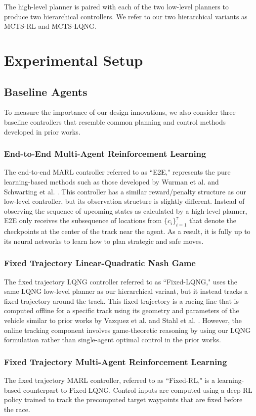 The high-level planner is paired with each of the two low-level planners to produce two hierarchical controllers. We refer to our two hierarchical variants as MCTS-RL and MCTS-LQNG.

\section{Experimental Setup}
\subsection{Baseline Agents}
To measure the importance of our design innovations, we also consider three baseline controllers that resemble common planning and control methods developed in prior works.  
\subsubsection{End-to-End Multi-Agent Reinforcement Learning}
The end-to-end MARL controller referred to as ``E2E," represents the pure learning-based methods such as those developed by Wurman et al. and Schwarting et al. \cite{sonyai, Schwarting2021}. This controller has a similar reward/penalty structure as our low-level controller, but its observation structure is slightly different. Instead of observing the sequence of upcoming states as calculated by a high-level planner, E2E only receives the subsequence of locations from $\{c_i\}_{i=1}^{\tau}$ that denote the checkpoints at the center of the track near the agent. As a result, it is fully up to its neural networks to learn how to plan strategic and safe moves. 

\subsubsection{Fixed Trajectory Linear-Quadratic Nash Game}
The fixed trajectory LQNG controller referred to as ``Fixed-LQNG," uses the same LQNG low-level planner as our hierarchical variant, but it instead tracks a fixed trajectory around the track. This fixed trajectory is a racing line that is computed offline for a specific track using its geometry and parameters of the vehicle similar to prior works by Vazquez et al. and Stahl et al. \cite{Vazquez2020, Stahl2019_2}. However, the online tracking component involves game-theoretic reasoning by using our LQNG formulation rather than single-agent optimal control in the prior works.

\subsubsection{Fixed Trajectory Multi-Agent Reinforcement Learning}
The fixed trajectory MARL controller, referred to as ``Fixed-RL," is a learning-based counterpart to Fixed-LQNG. Control inputs are computed using a deep RL policy trained to track the precomputed target waypoints that are fixed before the race.  
